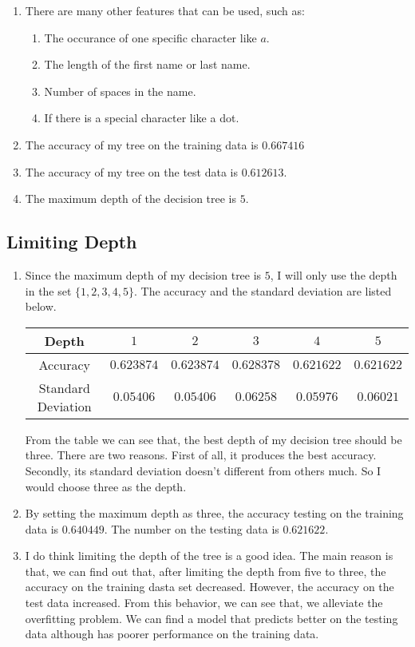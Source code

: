 \documentclass{article}[12pt]
\begin{document}
\begin{enumerate}
			\item There are many other features that can be used, such as:
				\begin{enumerate}
					\item The occurance of one specific character like $a$.
					\item The length of the first name or last name.
					\item Number of spaces in the name.
					\item If there is a special character like a dot.
				\end{enumerate}
			\item The accuracy of my tree on the training data is $0.667416$
			\item The accuracy of my tree on the test data is $0.612613$.
			\item The maximum depth of the decision tree is $5$.
		\end{enumerate}
		\subsection{Limiting Depth}
			\begin{enumerate}
				\item Since the maximum depth of my decision tree is $5$, I will only use the depth in the set $\{1, 2, 3, 4, 5\}$.
				The accuracy and the standard deviation are listed below. \newline
				\begin{tabular}{|c|c|c|c|c|c|}
					\hline
					Depth & $1$ & $2$ & $3$ & $4$ & $5$ \\
					\hline
					Accuracy & $0.623874$& $0.623874$& $ \mathbf{0.628378}$ & $0.621622$&$0.621622$ \\
					\hline
					Standard Deviation & $0.05406$& $0.05406$&$0.06258$ & $0.05976$&$0.06021$ \\
					\hline
				\end{tabular}
				\newline From the table we can see that, the best depth of my decision tree should be three. There are two reasons. First of all, it produces the best accuracy. Secondly, its standard deviation doesn't different from others much. So I would choose three as the depth.
				\item By setting the maximum depth as three, the accuracy testing on the training data is $0.640449$. The number on the testing data is $0.621622$.
				\item I do think limiting the depth of the tree is a good idea. The main reason is that, we can find out that, after limiting the depth from five to three, the accuracy on the training dasta set decreased. However, the accuracy on the test data increased. From this behavior, we can see that, we alleviate the overfitting problem. We can find a model that predicts better on the testing data although has poorer performance on the training data.
			\end{enumerate}
		
\end{document}
